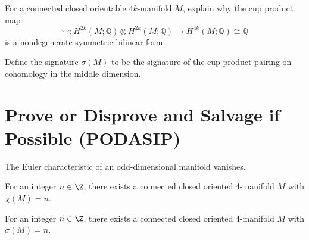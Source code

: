 \documentclass{homework}
\newcommand{\Q}{\mathbb{Q}}
\begin{document}
\begin{problem}
  For a connected closed orientable $4k$-manifold $M$, explain why the cup product map
  \[
    \smallsmile : H^{2k}(M;\Q) \otimes 
    H^{2k}(M;\Q) \to H^{4k}(M;\Q) \cong \Q
  \]
  is a nondegenerate symmetric bilinear form.

  Define the signature $\sigma(M)$ to be the signature of the cup
product pairing on cohomology in the middle dimension.
\end{problem}

\section{Prove or Disprove and Salvage if Possible (PODASIP)}

\begin{problem} %
  The Euler characteristic of an odd-dimensional manifold vanishes.
\end{problem}

\begin{problem}
  For an integer $n \in \Z$, there exists a connected closed oriented 4-manifold $M$ with $\chi(M) = n$.
\end{problem}

\begin{problem}
  For an integer $n \in \Z$, there exists a connected closed oriented 4-manifold $M$ with $\sigma(M) = n$.
\end{problem}
\end{document}
